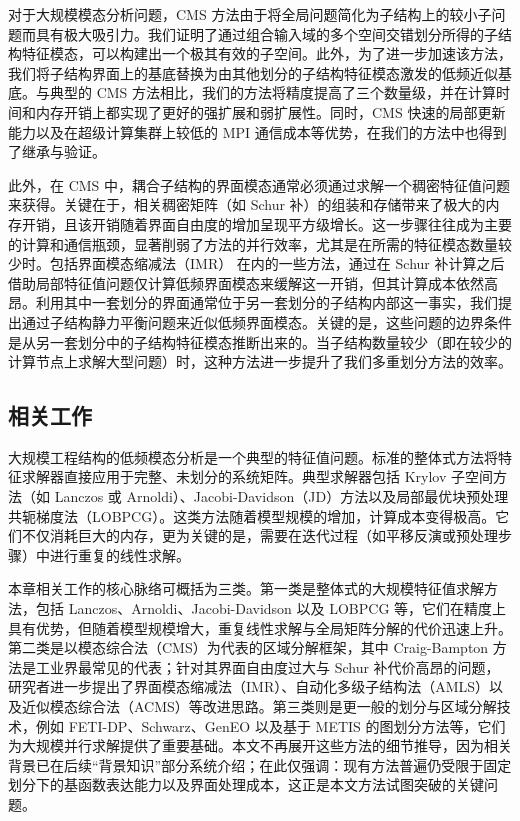 对于大规模模态分析问题，CMS 方法由于将全局问题简化为子结构上的较小子问题而具有极大吸引力。我们证明了通过组合输入域的多个空间交错划分所得的子结构特征模态，可以构建出一个极其有效的子空间。此外，为了进一步加速该方法，我们将子结构界面上的基底替换为由其他划分的子结构特征模态激发的低频近似基底。与典型的 CMS 方法相比，我们的方法将精度提高了三个数量级，并在计算时间和内存开销上都实现了更好的强扩展和弱扩展性。同时，CMS 快速的局部更新能力以及在超级计算集群上较低的 MPI 通信成本等优势，在我们的方法中也得到了继承与验证。

此外，在 CMS 中，耦合子结构的界面模态通常必须通过求解一个稠密特征值问题来获得。\textcolor{IsConclusion}{关键在于，相关稠密矩阵（如 Schur 补）的组装和存储带来了极大的内存开销，且该开销随着界面自由度的增加呈现平方级增长。这一步骤往往成为主要的计算和通信瓶颈，显著削弱了方法的并行效率，尤其是在所需的特征模态数量较少时。}包括界面模态缩减法（IMR）\cite{Kuether2017InterfaceReduction, KRATTIGER2019Riview} 在内的一些方法，通过在 Schur 补计算之后借助局部特征值问题仅计算低频界面模态来缓解这一开销，但其计算成本依然高昂。利用其中一套划分的界面通常位于另一套划分的子结构内部这一事实，我们提出通过子结构静力平衡问题来近似低频界面模态。关键的是，这些问题的边界条件是从另一套划分中的子结构特征模态推断出来的。当子结构数量较少（即在较少的计算节点上求解大型问题）时，这种方法进一步提升了我们多重划分方法的效率。

\subsection{相关工作}

大规模工程结构的低频模态分析是一个典型的特征值问题。标准的整体式方法将特征求解器直接应用于完整、未划分的系统矩阵。典型求解器包括 Krylov 子空间方法（如 Lanczos 或 Arnoldi）\cite{Hernandez2005SLEPc, Qiu2015Spectra}、Jacobi-Davidson（JD）方法\cite{Sleijpen2000JD}以及局部最优块预处理共轭梯度法（LOBPCG）\cite{knyazev2001lobpcg}。这类方法随着模型规模的增加，计算成本变得极高。它们不仅消耗巨大的内存，更为关键的是，需要在迭代过程（如平移反演或预处理步骤）中进行重复的线性求解。

本章相关工作的核心脉络可概括为三类。第一类是整体式的大规模特征值求解方法，包括 Lanczos、Arnoldi、Jacobi-Davidson 以及 LOBPCG 等，它们在精度上具有优势，但随着模型规模增大，重复线性求解与全局矩阵分解的代价迅速上升。第二类是以模态综合法（CMS）为代表的区域分解框架，其中 Craig-Bampton 方法是工业界最常见的代表；针对其界面自由度过大与 Schur 补代价高昂的问题，研究者进一步提出了界面模态缩减法（IMR）、自动化多级子结构法（AMLS）以及近似模态综合法（ACMS）等改进思路。第三类则是更一般的划分与区域分解技术，例如 FETI-DP、Schwarz、GenEO 以及基于 METIS 的图划分方法等，它们为大规模并行求解提供了重要基础。本文不再展开这些方法的细节推导，因为相关背景已在后续“背景知识”部分系统介绍；在此仅强调：现有方法普遍仍受限于固定划分下的基函数表达能力以及界面处理成本，这正是本文方法试图突破的关键问题。

